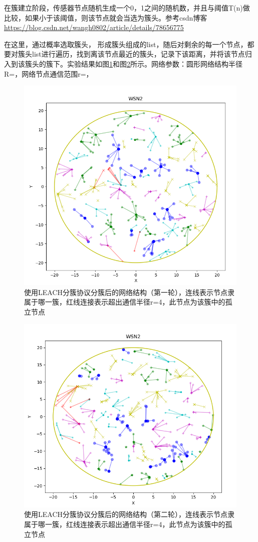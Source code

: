 \documentclass[UTF8]{article} %
\begin{document}
	 在簇建立阶段，传感器节点随机生成一个0，1之间的随机数，并且与阈值T(n)做比较，如果小于该阈值，则该节点就会当选为簇头。参考csdn博客\url{https://blog.csdn.net/wangh0802/article/details/78656775}
	 
	 在这里，通过概率选取簇头， 形成簇头组成的list，随后对剩余的每一个节点，都要对簇头list进行遍历，找到离该节点最近的簇头，记录下该距离，并将该节点归入到该簇头的簇下。实验结果如图\ref{fig:figure2}和图\ref{fig:figure4}所示。网络参数：圆形网络结构半径R=，网络节点通信范围r=，
	 
	\begin{figure}[H]
		\centering
		\includegraphics[width=0.65\linewidth]{screenshot011}
		\caption{使用LEACH分簇协议分簇后的网络结构（第一轮），连线表示节点隶属于哪一簇，红线连接表示超出通信半径r=4，此节点为该簇中的孤立节点}
		\label{fig:figure2}
	\end{figure}
 
	\begin{figure}[H]
		\centering
		\includegraphics[width=0.65\linewidth]{screenshot012}
		\caption{使用LEACH分簇协议分簇后的网络结构（第二轮），连线表示节点隶属于哪一簇，红线连接表示超出通信半径r=4，此节点为该簇中的孤立节点}
		\label{fig:figure4}
	\end{figure}
 
\end{document}
